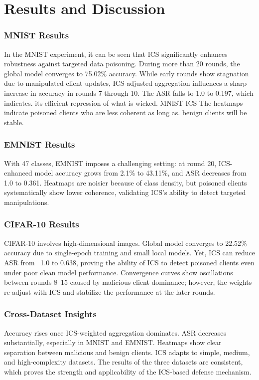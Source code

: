 \documentclass[conference]{IEEEtran}
\begin{document}
\section{Results and Discussion}
\label{sec:results}

\subsubsection{MNIST Results}
In the MNIST experiment, it can be seen that ICS significantly enhances robustness against targeted data poisoning. During more than 20 rounds, the global model converges to 75.02\% accuracy. While early rounds show stagnation due to manipulated client updates, ICS-adjusted aggregation influences a sharp increase in accuracy in rounds 7 through 10. The ASR falls to 1.0 to 0.197, which indicates.
its efficient repression of what is wicked. MNIST ICS
The heatmaps indicate poisoned clients who are less coherent as long as.
benign clients will be stable.

\subsubsection{EMNIST Results}
With 47 classes, EMNIST imposes a challenging setting: at round 20, ICS-enhanced model accuracy grows from 2.1\% to 43.11\%, and ASR decreases from 1.0 to 0.361. Heatmaps are noisier because of class density, but poisoned clients systematically show lower coherence, validating ICS's ability to detect targeted manipulations.

\subsubsection{CIFAR-10 Results}
CIFAR-10 involves high-dimensional images. Global model converges to 22.52\% accuracy due to single-epoch training and small local models. Yet, ICS can reduce ASR from ~1.0 to 0.638, proving the ability of ICS to detect poisoned clients even under poor clean model performance. Convergence curves show oscillations between rounds 8–15 caused by malicious client dominance; however, the weights re-adjust with ICS and stabilize the performance at the later rounds.

\subsubsection{Cross-Dataset Insights}
Accuracy rises once ICS-weighted aggregation dominates. ASR decreases substantially, especially in MNIST and EMNIST. Heatmaps show clear separation between malicious and benign clients. ICS adapts to simple, medium, and high-complexity datasets. The results of the three datasets are consistent, which proves the strength and applicability of the ICS-based defense mechanism.
\end{document}
